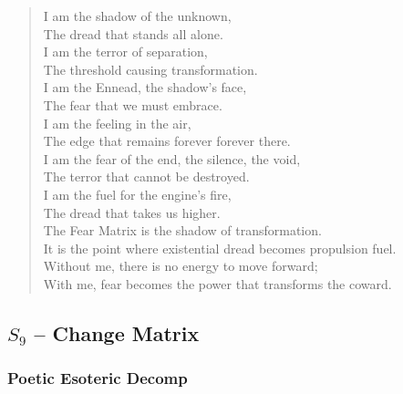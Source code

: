 \begin{verse}
I am the shadow of the unknown, \\
The dread that stands all alone. \\
I am the terror of separation, \\
The threshold causing transformation. \\
I am the Ennead, the shadow's face, \\
The fear that we must embrace. \\
\vspace{1em}
I am the feeling in the air, \\
The edge that remains forever forever there. \\
I am the fear of the end, the silence, the void, \\
The terror that cannot be destroyed. \\
I am the fuel for the engine's fire, \\
The dread that takes us higher. \\
\vspace{1em}
The Fear Matrix is the shadow of transformation. \\
It is the point where existential dread becomes propulsion fuel. \\
Without me, there is no energy to move forward; \\
With me, fear becomes the power that transforms the coward.
\end{verse}

\subsection{$S_{9}$ -- Change Matrix}\label{sec:poetic.S9}

\subsubsection{Poetic Esoteric Decomp}

